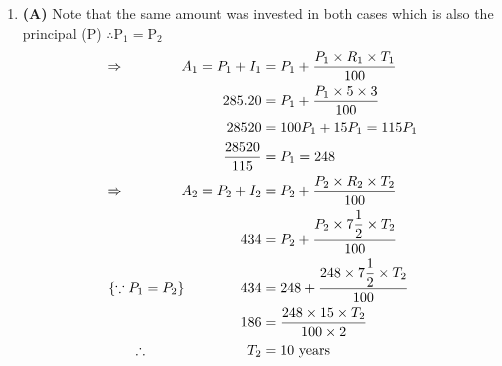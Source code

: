 \begin{multicols}{2}
\begin{enumerate}[label={\textbf{\arabic*.}}]
    \item \textbf{(A)} Note that the same amount was invested in both cases which is also the principal (P) 
    \( \therefore \text{P}_1 = \text{P}_2\)
    \begin{align*} 
        \Rightarrow \hspace{40px} A_1 = P_1 + I_1 &= P_1 + \dfrac{P_1 \times R_1 \times T_1}{100} \\
        285.20&= P_1 + \dfrac{P_1 \times 5 \times 3}{100} \\
         28520 &= 100P_1 + 15P_1 = 115P_1 \\
         \dfrac{28520}{115}&= P_1 = 248 \\
        \Rightarrow \hspace{40px}  A_2 = P_2 + I_2 &= P_2 + \dfrac{P_2 \times R_2 \times T_2}{100} \\
        434&= P_2 + \dfrac{P_2 \times 7\dfrac{1}{2} \times T_2}{100} \\
        \{ \because P_1 = P_2\} \hspace{40px} 434&= 248 + \dfrac{248 \times 7\dfrac{1}{2} \times T_2}{100} \\
        186 &= \dfrac{248 \times 15 \times T_2}{100 \times 2} \\
        \therefore \hspace{70px} T_2 & = 10 \text{ years}
    \end{align*}
    

\end{enumerate}
\end{multicols}
